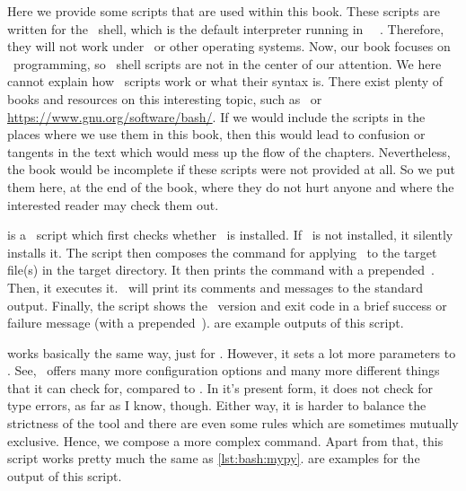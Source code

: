 %
%
%
%
%
%
%
%
Here we provide some scripts that are used within this book.
These scripts are written for the \bash\ shell, which is the default interpreter running in \ubuntu\ \linux\ .
Therefore, they will not work under \windows\ or other operating systems.
Now, our book focuses on \python\ programming, so \bash\ shell scripts are not in the center of our attention.
We here cannot explain how \bash\ scripts work or what their syntax is.
There exist plenty of books and resources on this interesting topic, such as~\cite{NR2005LTBSUSPCB3,Z2017MB,BN2018BC} or \url{https://www.gnu.org/software/bash/}.
If we would include the scripts in the places where we use them in this book, then this would lead to confusion or tangents in the text which would mess up the flow of the chapters.
Nevertheless, the book would be incomplete if these scripts were not provided at all.
So we put them here, at the end of the book, where they do not hurt anyone and where the interested reader may check them out.%

 is a \bash\ script which first checks whether \mypy\ is installed.
If \mypy\ is not installed, it silently installs it.
The script then composes the command for applying \mypy\ to the target file(s) in the target directory.
It then prints the command with a prepended~\expandafter\textil{\$}.
Then, it executes it.
\mypy\ will print its comments and messages to the standard output.
Finally, the script shows the \mypy\ version and exit code in a brief success or failure message (with a prepended~\expandafter\textil{\#}).
 are example outputs of this script.

 works basically the same way, just for \ruff.
However, it sets a lot more parameters to \ruff.
See, \ruff\ offers many more configuration options and many more different things that it can check for, compared to \mypy.
In it's present form, it does not check for type errors, as far as I know, though.
Either way, it is harder to balance the strictness of the tool and there are even some rules which are sometimes mutually exclusive.
Hence, we compose a more complex command.
Apart from that, this script works pretty much the same as \cref{lst:bash:mypy}.
 are examples for the output of this script.

